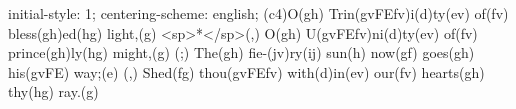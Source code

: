 initial-style: 1;
centering-scheme: english;
(c4)O(gh) Trin(gvFEfv)i(d)ty(ev) of(fv) bless(gh)ed(hg) light,(g) <sp>*</sp>(,)
O(gh) U(gvFEfv)ni(d)ty(ev) of(fv) prince(gh)ly(hg) might,(g) (;)
The(gh) fie-(jv)ry(ij) sun(h) now(gf) goes(gh) his(gvFE) way;(e) (,)
Shed(fg) thou(gvFEfv) with(d)in(ev) our(fv) hearts(gh) thy(hg) ray.(g)

